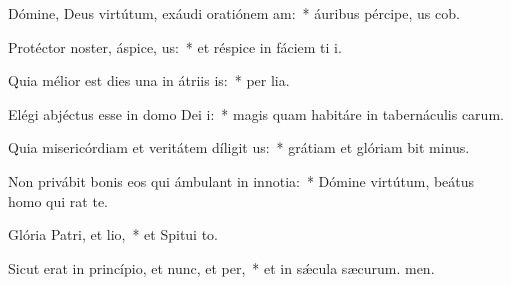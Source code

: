 \item Dómine, Deus virtútum, exáudi oratiónem am:~* áuribus pércipe, us cob.
\item Protéctor noster, áspice, us:~* et réspice in fáciem ti i.
\item Quia mélior est dies una in átriis is:~* per lia.
\item Elégi abjéctus esse in domo Dei i:~* magis quam habitáre in tabernáculis carum.
\item Quia misericórdiam et veritátem díligit us:~* grátiam et glóriam bit minus.
\item Non privábit bonis eos qui ámbulant in innotia:~* Dómine virtútum, beátus homo qui rat  te.
\item Glória Patri, et lio,~* et Spitui to.
\item Sicut erat in princípio, et nunc, et per,~* et in sǽcula sæcurum. men.
